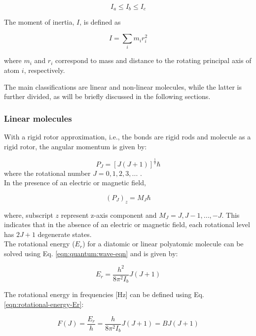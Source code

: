 \begin{equation}
    \label{eqn:Iabc-reltion}
    I_a \leq I_b \leq I_c
\end{equation}

The moment of inertia, $I$, is defined as 

\begin{equation}
    \label{eqn:moment-of-inertia}
    I = \sum_i m_i r_i^2
\end{equation}

where $m_i$ and $r_i$ correspond to mass and distance to the rotating principal axis of atom $i$, respectively.

The main classifications are linear and non-linear molecules, while the latter is further divided, as will be briefly discussed in the following sections.

\subsubsection{Linear molecules}
\label{sec:mol-rotation:linear}

With a rigid rotor approximation, i.e., the bonds are rigid rods and molecule as a rigid rotor, the angular momentum is given by:

\[P_J = [J(J+1)]^{\frac{1}{2}} \hbar\]
where the rotational number $J=0, 1, 2, 3, ...$ .\\

In the presence of an electric or magnetic field,

\begin{equation}
    \label{eqn:rotation:MJ}
    (P_J)_z = M_J \hbar
\end{equation}

where, subscript $z$ represent z-axis component and $M_J = J, J-1, ..., -J$. This indicates that in the absence of an electric or magnetic field, each rotational level has $2J+1$ degenerate states.\\

The rotational energy ($E_r$) for a diatomic or linear polyatomic molecule can be solved using Eq. \ref{eqn:quantum:wave-eqn} and is given by:

\begin{equation}
    \label{eqn:rotational-energy-Er}
    E_r = \frac{h^2}{8\pi^2 I_b} J (J+1)
\end{equation}

The rotational energy in frequencies [Hz] can be defined using Eq. \ref{eqn:rotational-energy-Er}:

\begin{equation}
    \label{eqn:rotational-energy-FJ}
    F(J) = \frac{E_r}{h} = \frac{h}{8\pi^2 I_b} J(J+1) = BJ(J+1)
\end{equation}

